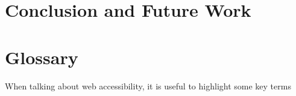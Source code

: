 \documentclass[ %
                    author={Aleena Baig},
                supervisor={Dr Simon Lock},
                    degree={BSc},
                     title={On Making Web Accessible Graphs},
                  subtitle={},
                      year={2019} ]{dissertation}
\begin{document}
\chapter{Conclusion and Future Work}


\chapter{Glossary}


When talking about web accessibility, it is useful to highlight some key terms

\BlankLine
%
\glsaddall 
\printglossary[nonumberlist]

\printbibliography
\end{document}
